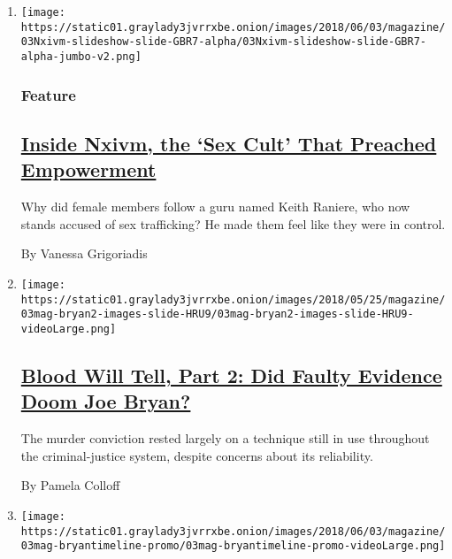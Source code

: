 \begin{enumerate}
\def\labelenumi{\arabic{enumi}.}
\item
  \texttt{[image: https://static01.graylady3jvrrxbe.onion/images/2018/06/03/magazine/03Nxivm-slideshow-slide-GBR7-alpha/03Nxivm-slideshow-slide-GBR7-alpha-jumbo-v2.png]}

  \hypertarget{feature}{%
  \subsubsection{Feature}\label{feature}}

  \hypertarget{inside-nxivm-the-sex-cult-that-preached-empowerment}{%
  \subsection{\texorpdfstring{\href{/2018/05/30/magazine/sex-cult-empowerment-nxivm-keith-raniere.html}{Inside
  Nxivm, the `Sex Cult' That Preached
  Empowerment}}{Inside Nxivm, the `Sex Cult' That Preached Empowerment}}\label{inside-nxivm-the-sex-cult-that-preached-empowerment}}

  Why did female members follow a guru named Keith Raniere, who now
  stands accused of sex trafficking? He made them feel like they were in
  control.

  By Vanessa Grigoriadis
\item
  \texttt{[image: https://static01.graylady3jvrrxbe.onion/images/2018/05/25/magazine/03mag-bryan2-images-slide-HRU9/03mag-bryan2-images-slide-HRU9-videoLarge.png]}

  \hypertarget{blood-will-tell-part-2-did-faulty-evidence-doom-joe-bryan}{%
  \subsection{\texorpdfstring{\href{/interactive/2018/05/31/magazine/joe-bryan-part-2-blood-spatter-analysis-faulty-evidence.html}{Blood
  Will Tell, Part 2: Did Faulty Evidence Doom Joe
  Bryan?}}{Blood Will Tell, Part 2: Did Faulty Evidence Doom Joe Bryan?}}\label{blood-will-tell-part-2-did-faulty-evidence-doom-joe-bryan}}

  The murder conviction rested largely on a technique still in use
  throughout the criminal-justice system, despite concerns about its
  reliability.

  By Pamela Colloff
\item
  \texttt{[image: https://static01.graylady3jvrrxbe.onion/images/2018/06/03/magazine/03mag-bryantimeline-promo/03mag-bryantimeline-promo-videoLarge.png]}


\end{enumerate}
